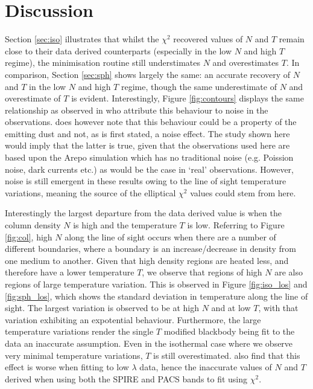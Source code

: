 \documentclass{report}
\begin{document}
\chapter{Discussion}
Section \ref{sec:iso} illustrates that whilst the $\chi^{2}$ recovered values of $N$ and $T$ remain close to their data derived counterparts (especially in the low $N$ and high $T$ regime), the minimisation routine still understimates $N$ and overestimates $T$. In comparison, Section \ref{sec:sph} shows largely the same: an accurate recovery of $N$ and $T$ in the low $N$ and high $T$ regime, though the same underestimate of $N$ and overestimate of $T$ is evident. Interestingly, Figure \ref{fig:contours} displays the same relationship as observed in \textcite{noise,noiseb} who attribute this behaviour to noise in the observations. \textcite{noise,noiseb} does however note that this behaviour could be a property of the emitting dust and not, as is first stated, a noise effect. The study shown here would imply that the latter is true, given that the observations used here are based upon the Arepo simulation which has no traditional noise (e.g. Poission noise, dark currents etc.) as would be the case in `real' observations. However, noise is still emergent in these results owing to the line of sight temperature variations, meaning the source of the elliptical $\chi^{2}$ values could stem from here.

Interestingly the largest departure from the data derived value is when the column density $N$ is high and the temperature $T$ is low. Referring to Figure \ref{fig:col}, high $N$ along the line of sight occurs when there are a number of different boundaries, where a boundary is an increase/decrease in density from one medium to another. Given that high density regions are heated less, and therefore have a lower temperature $T$, we observe that regions of high $N$ are also regions of large temperature variation. This is observed in Figure \ref{fig:iso_los} and \ref{fig:sph_los}, which shows the standard deviation in temperature along the line of sight. The largest variation is observed to be at high $N$ and at low $T$, with that variation exhibiting an expotential behaviour. Furthermore, the large temperature variations render the single $T$ modified blackbody being fit to the data an inaccurate assumption. Even in the isothermal case where we observe very minimal temperature variations, $T$ is still overestimated. \textcite{noise,noiseb} also find that this effect is worse when fitting to low $\lambda$ data, hence the inaccurate values of $N$ and $T$ derived when using both the SPIRE and PACS bands to fit using $\chi^{2}$.
\end{document}
